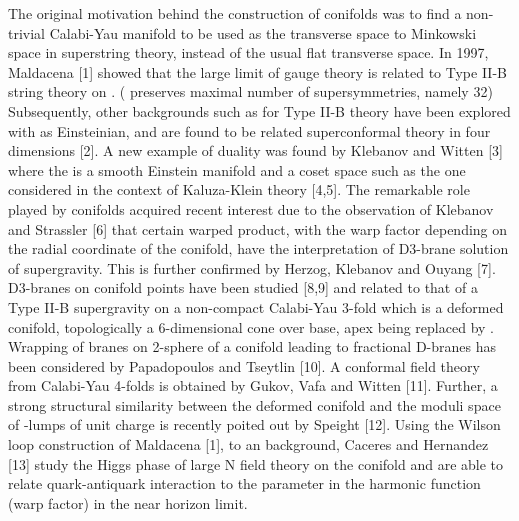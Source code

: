\documentclass[a4paper,12pt]{article}
\begin{document}
{The original motivation behind the construction of conifolds was to find a non-trivial Calabi-Yau manifold to be used as the transverse space to Minkowski space in superstring theory, instead of the usual flat transverse space. In 1997, Maldacena [1] showed that the large \coordHE{} limit of \coordHE{} gauge theory
is related to Type II-B string theory on \coordHE{}. (\coordHE{} 
preserves maximal number of supersymmetries, namely 32) Subsequently, other
backgrounds such as \coordHE{} for Type II-B theory have been explored 
with \coordHE{} as Einsteinian, and are found to be related \coordHE{} superconformal theory in four dimensions [2]. A new example of duality was found by Klebanov and Witten [3] where the \coordHE{} is a smooth Einstein manifold and a coset 
space such as the one considered in the context of Kaluza-Klein theory [4,5].
The
remarkable role played by conifolds acquired recent interest due to the 
observation of Klebanov and Strassler [6] that certain warped product, with
the warp factor depending on the radial coordinate of the conifold, have the 
interpretation of D3-brane solution of supergravity. This is further confirmed
by Herzog, Klebanov and Ouyang [7]. D3-branes on conifold points have been
studied [8,9] and related to that of a Type II-B supergravity on a 
non-compact Calabi-Yau 3-fold which is a deformed conifold, topologically
a 6-dimensional cone over \coordHE{} base, apex being replaced by \coordHE{}.
Wrapping of branes on 2-sphere of a conifold leading to fractional D-branes
has been considered by Papadopoulos and Tseytlin [10]. A conformal field theory  from Calabi-Yau 4-folds is obtained by Gukov, Vafa and Witten [11]. Further,
a strong structural similarity between the deformed conifold and 
the moduli space of \coordHE{}-lumps
of unit charge is recently poited out by Speight [12]. Using the Wilson loop 
construction of Maldacena [1], to an \coordHE{} background, Caceres
and Hernandez [13] study the Higgs phase of large N field theory on the conifold and are able to relate quark-antiquark interaction to the parameter in the
harmonic function (warp factor) in the near horizon limit. 

\vspace{0.5cm}

}
\end{document}
